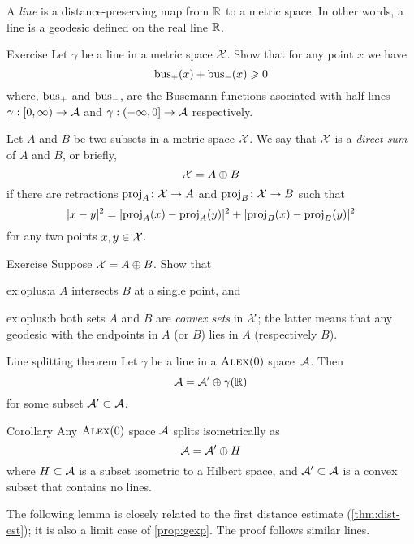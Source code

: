 A \emph{line} is a distance-preserving map
from $\RR$ to a metric space.
In other words, a line is a geodesic defined on the real line $\RR$.

\begin{thm}{Exercise}\label{ex:bus+bus}
Let $\gamma$ be a line in a metric space $\spc{X}$.
Show that for any point $x$ we have
\[\bus_+(x)+\bus_-(x)\ge 0\]
where, $\bus_+$ and $\bus_-$, are the Busemann functions asociated with half-lines $\gamma:[0,\infty)\to \spc{A}$ and $\gamma:(-\infty,0]\to \spc{A}$ respectively.
\end{thm}


Let $A$ and $B$ be two subsets in a metric space $\spc{X}$.
We say that $\spc{X}$ is a \emph{direct sum} of $A$ and $B$,
or briefly,
\[\spc{X}=A\oplus B\]
if there are retractions $\proj_A\:\spc{X}\to A$
and 
$\proj_B\:\spc{X}\to B$
such that 
\[\dist[2]{x}{y}{}=\dist[2]{\proj_A(x)}{\proj_A(y)}{}+\dist[2]{\proj_B(x)}{\proj_B(y)}{}\]
for any two points $x,y\in \spc{X}$.

\begin{thm}{Exercise}\label{ex:oplus}
Suppose $\spc{X}=A\oplus B$.
Show that
\begin{subthm}{ex:oplus:a}
 $A$ intersects $B$ at a single point, and
\end{subthm}

\begin{subthm}{ex:oplus:b}
both sets $A$ and $B$ are \emph{convex sets} in $\spc{X}$;
the latter means that any geodesic with the endpoints in $A$ (or $B$) lies in $A$ (respectively $B$).
\end{subthm}

\end{thm}


\begin{thm}{Line splitting theorem}\label{thm:splitting}
Let $\gamma$ be a line in a $\Alex0$ space~$\spc{A}$. 
Then 
\[\spc{A}=\spc{A}'\oplus \gamma(\RR)\]
for some subset $\spc{A}'\subset \spc{A}$.
\end{thm}

\begin{thm}{Corollary}\label{cor:splitting}
Any $\Alex0$ space $\spc{A}$ splits isometrically as
\[
\spc{A}=\spc{A}'\oplus H
\]
where $H\subset \spc{A}$ is a subset isometric to a Hilbert space, and $\spc{A}'\subset \spc{A}$ is a convex subset that contains no lines. 
\end{thm}

The following lemma is closely related to the first distance estimate (\ref{thm:dist-est});
it is also a limit case of \ref{prop:gexp}.
The proof follows similar  lines.

